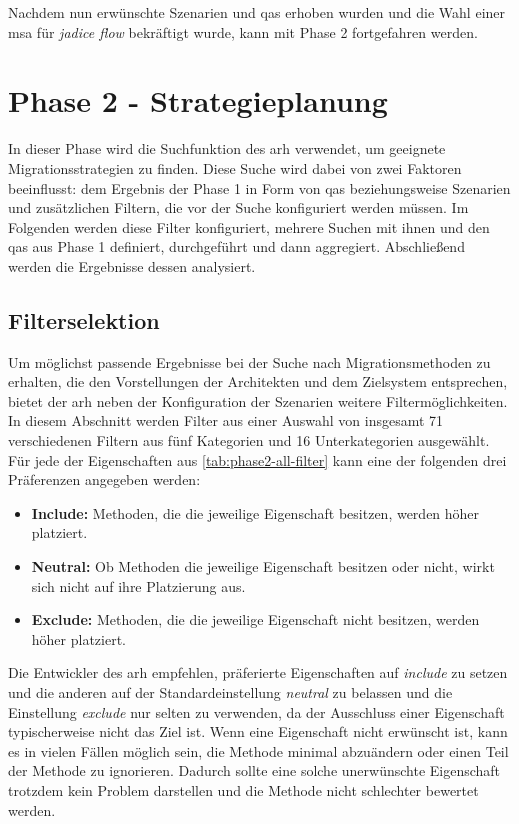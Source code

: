 Nachdem nun erwünschte Szenarien und \glspl{qa} erhoben wurden und die Wahl einer \gls{msa} für \emph{jadice flow} bekräftigt wurde, kann mit Phase 2 fortgefahren werden.

\section{Phase 2 - Strategieplanung}
\label{sec:durchführung-phase2}

In dieser Phase wird die Suchfunktion des \gls{arh} verwendet, um geeignete Migrationsstrategien zu finden.
Diese Suche wird dabei von zwei Faktoren beeinflusst: dem Ergebnis der Phase 1 in Form von \glspl{qa} beziehungsweise Szenarien und zusätzlichen Filtern, die vor der Suche konfiguriert werden müssen.
Im Folgenden werden diese Filter konfiguriert, mehrere Suchen mit ihnen und den \glspl{qa} aus Phase 1 definiert, durchgeführt und dann aggregiert.
Abschließend werden die Ergebnisse dessen analysiert.

\subsection{Filterselektion}
\label{sec:filterselektion}

Um möglichst passende Ergebnisse bei der Suche nach Migrationsmethoden zu erhalten, die den Vorstellungen der Architekten und dem Zielsystem entsprechen, bietet der \gls{arh} neben der Konfiguration der Szenarien weitere Filtermöglichkeiten.
In diesem Abschnitt werden Filter aus einer Auswahl von insgesamt  71 verschiedenen Filtern aus fünf Kategorien und 16 Unterkategorien ausgewählt.
Für jede der Eigenschaften aus \cref{tab:phase2-all-filter} kann eine der folgenden drei Präferenzen angegeben werden:
\begin{itemize}
	\item \textbf{Include:} Methoden, die die jeweilige Eigenschaft besitzen, werden höher platziert.
	\item \textbf{Neutral:} Ob Methoden die jeweilige Eigenschaft besitzen oder nicht, wirkt sich nicht auf ihre Platzierung aus.
	\item \textbf{Exclude:} Methoden, die die jeweilige Eigenschaft nicht besitzen, werden höher platziert.
\end{itemize}



Die Entwickler des \gls{arh} empfehlen, präferierte Eigenschaften auf \emph{include} zu setzen und die anderen auf der Standardeinstellung \emph{neutral} zu belassen und die Einstellung \emph{exclude} nur selten zu verwenden, da der Ausschluss einer Eigenschaft typischerweise nicht das Ziel ist.
Wenn eine Eigenschaft nicht erwünscht ist, kann es in vielen Fällen möglich sein, die Methode minimal abzuändern oder einen Teil der Methode zu ignorieren.
Dadurch sollte eine solche unerwünschte Eigenschaft trotzdem kein Problem darstellen und die Methode nicht schlechter bewertet werden.

